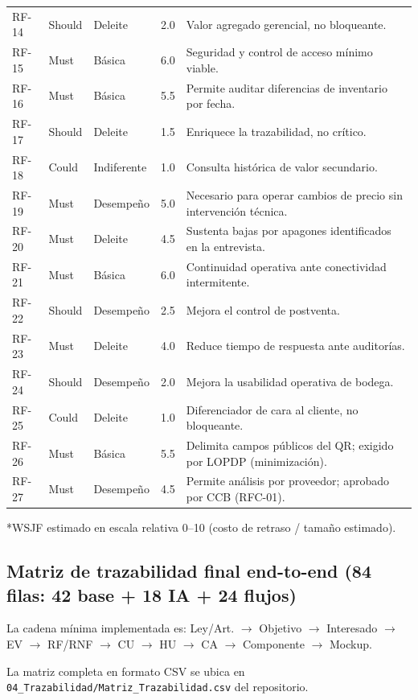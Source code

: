 \documentclass[11pt,a4paper]{article}
\begin{document}
\begin{longtable}{|p{1.3cm}|p{1.8cm}|p{2.2cm}|p{1.6cm}|p{7.5cm}|}
RF-14 & Should & Deleite & 2.0 & Valor agregado gerencial, no bloqueante. \\
RF-15 & Must & Básica & 6.0 & Seguridad y control de acceso mínimo viable. \\
RF-16 & Must & Básica & 5.5 & Permite auditar diferencias de inventario por fecha. \\
RF-17 & Should & Deleite & 1.5 & Enriquece la trazabilidad, no crítico. \\
RF-18 & Could & Indiferente & 1.0 & Consulta histórica de valor secundario. \\
RF-19 & Must & Desempeño & 5.0 & Necesario para operar cambios de precio sin intervención técnica. \\
RF-20 & Must & Deleite & 4.5 & Sustenta bajas por apagones identificados en la entrevista. \\
RF-21 & Must & Básica & 6.0 & Continuidad operativa ante conectividad intermitente. \\
RF-22 & Should & Desempeño & 2.5 & Mejora el control de postventa. \\
RF-23 & Must & Deleite & 4.0 & Reduce tiempo de respuesta ante auditorías. \\
RF-24 & Should & Desempeño & 2.0 & Mejora la usabilidad operativa de bodega. \\
RF-25 & Could & Deleite & 1.0 & Diferenciador de cara al cliente, no bloqueante. \\
RF-26 & Must & Básica & 5.5 & Delimita campos públicos del QR; exigido por LOPDP (minimización). \\
RF-27 & Must & Desempeño & 4.5 & Permite análisis por proveedor; aprobado por CCB (RFC-01). \\
\hline
\end{longtable}
\footnotesize{*WSJF estimado en escala relativa 0--10 (costo de retraso / tamaño estimado).}

\subsection{Matriz de trazabilidad final end-to-end (84 filas: 42 base + 18 IA + 24 flujos)}

La cadena mínima implementada es: Ley/Art. $\to$ Objetivo $\to$ Interesado $\to$ EV $\to$ RF/RNF $\to$ CU $\to$ HU $\to$ CA $\to$ Componente $\to$ Mockup.

La matriz completa en formato CSV se ubica en \texttt{04\_Trazabilidad/Matriz\_Trazabilidad.csv} del repositorio.
\end{document}
